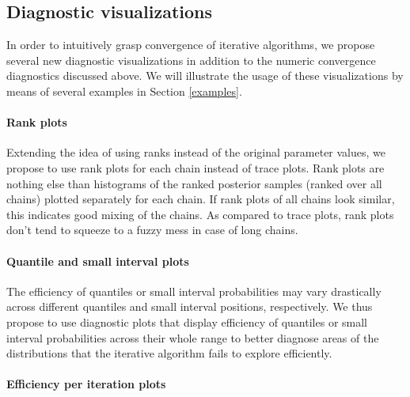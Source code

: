 \documentclass[american,]{article}
\let\oldparagraph\paragraph
\renewcommand{\paragraph}[1]{\oldparagraph{#1}\mbox{}}
\begin{document}
\hypertarget{diagnostic-visualizations}{%
\subsection{Diagnostic visualizations}\label{diagnostic-visualizations}}

In order to intuitively grasp convergence of iterative algorithms, we
propose several new diagnostic visualizations in addition to the numeric
convergence diagnostics discussed above. We will illustrate the usage of
these visualizations by means of several examples in Section
\ref{examples}.

\hypertarget{rank-plots}{%
\paragraph{Rank plots}\label{rank-plots}}

Extending the idea of using ranks instead of the original parameter
values, we propose to use rank plots for each chain instead
of trace plots. Rank plots are nothing else than histograms of the
ranked posterior samples (ranked over all chains) plotted separately for
each chain. If rank plots of all chains look similar, this indicates
good mixing of the chains. As compared to trace plots, rank plots don't
tend to squeeze to a fuzzy mess in case of long chains.

\hypertarget{quantile-and-small-interval-plots}{%
\paragraph{Quantile and small interval
plots}\label{quantile-and-small-interval-plots}}

The efficiency of quantiles or small interval probabilities may vary
drastically across different quantiles and small interval positions,
respectively. We thus propose to use diagnostic plots that display
efficiency of quantiles or small interval probabilities across their
whole range to better diagnose areas of the distributions that the
iterative algorithm fails to explore efficiently.

\hypertarget{efficiency-change-plots}{%
\paragraph{Efficiency per iteration plots}\label{efficiency-change-plots}}
\end{document}
